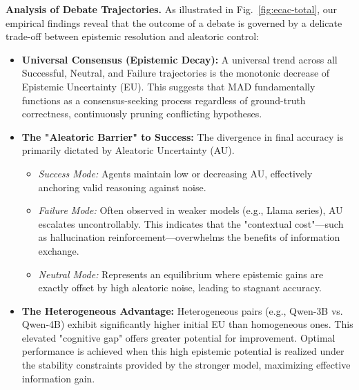 \documentclass{article}
\theoremstyle{plain}
\theoremstyle{definition}
\theoremstyle{remark}
\begin{document}
\textbf{Analysis of Debate Trajectories.} As illustrated in Fig.~\ref{fig:ecac-total}, our empirical findings reveal that the outcome of a debate is governed by a delicate trade-off between epistemic resolution and aleatoric control:

\begin{itemize} \item \textbf{Universal Consensus (Epistemic Decay):} A universal trend across all Successful, Neutral, and Failure trajectories is the monotonic decrease of Epistemic Uncertainty (EU). This suggests that MAD fundamentally functions as a consensus-seeking process regardless of ground-truth correctness, continuously pruning conflicting hypotheses.

\item \textbf{ The "Aleatoric Barrier" to Success:} The divergence in final accuracy is primarily dictated by Aleatoric Uncertainty (AU). 
\begin{itemize}
    \item \textit{Success Mode:} Agents maintain low or decreasing AU, effectively anchoring valid reasoning against noise.
    \item \textit{Failure Mode:} Often observed in weaker models (e.g., Llama series), AU escalates uncontrollably. This indicates that the "contextual cost"—such as hallucination reinforcement—overwhelms the benefits of information exchange.
    \item \textit{Neutral Mode:} Represents an equilibrium where epistemic gains are exactly offset by high aleatoric noise, leading to stagnant accuracy.
\end{itemize}

\item \textbf{The Heterogeneous Advantage:} Heterogeneous pairs (e.g., Qwen-3B vs. Qwen-4B) exhibit significantly higher initial EU than homogeneous ones. This elevated "cognitive gap" offers greater potential for improvement. Optimal performance is achieved when this high epistemic potential is realized under the stability constraints provided by the stronger model, maximizing effective information gain.

\end{itemize}
\end{document}
